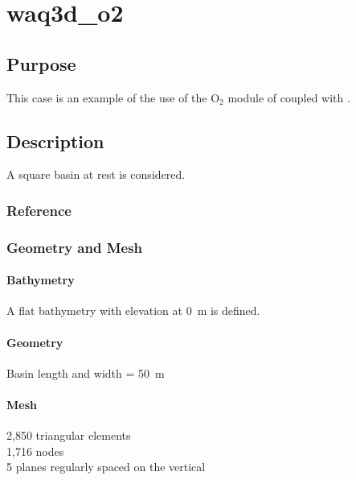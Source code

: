 \chapter{waq3d\_o2}
%
%
\section{Purpose}
%
This case is an example of the use of the O$_2$ module of \waqtel coupled with .
%
\section{Description}
%
A square basin at rest is considered.
%
%
%
%
\subsection{Reference}
%

%
%
%
\subsection{Geometry and Mesh}
%
\subsubsection{Bathymetry}
%
A flat bathymetry with elevation at 0~m is defined.
%
\subsubsection{Geometry}
%
Basin length and width = 50~m
%
\subsubsection{Mesh}
%
2,850 triangular elements\\
1,716 nodes\\
5 planes regularly spaced on the vertical
%
%
%
